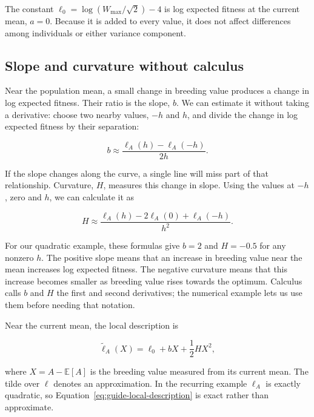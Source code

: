 \documentclass[11pt]{article}
\newcommand{\E}{\mathbb{E}}
\begin{document}
The constant $\ell_0=\log(W_{\max}/\sqrt{2})-4$ is log expected fitness at the current mean, $a=0$. Because it is added to every value, it does not affect differences among individuals or either variance component.

\subsection{Slope and curvature without calculus}

Near the population mean, a small change in breeding value produces a change in log expected fitness. Their ratio is the slope, $b$. We can estimate it without taking a derivative: choose two nearby values, $-h$ and $h$, and divide the change in log expected fitness by their separation:

\begin{equation}
b\approx\frac{\ell_A(h)-\ell_A(-h)}{2h}.
\label{eq:guide-finite-slope}
\end{equation}

If the slope changes along the curve, a single line will miss part of that relationship. Curvature, $H$, measures this change in slope. Using the values at $-h$, zero and $h$, we can calculate it as

\begin{equation}
H\approx
\frac{\ell_A(h)-2\ell_A(0)+\ell_A(-h)}{h^2}.
\label{eq:guide-finite-curvature}
\end{equation}

For our quadratic example, these formulas give $b=2$ and $H=-0.5$ for any nonzero $h$. The positive slope means that an increase in breeding value near the mean increases log expected fitness. The negative curvature means that this increase becomes smaller as breeding value rises towards the optimum. Calculus calls $b$ and $H$ the first and second derivatives; the numerical example lets us use them before needing that notation.

Near the current mean, the local description is

\begin{equation}
\widetilde\ell_A(X)=\ell_0+bX+\frac12HX^2,
\label{eq:guide-local-description}
\end{equation}

where $X=A-\E[A]$ is the breeding value measured from its current mean.  The
tilde over $\ell$ denotes an approximation.  In the recurring example
$\ell_A$ is exactly quadratic, so Equation~\eqref{eq:guide-local-description}
is exact rather than approximate.
\end{document}
